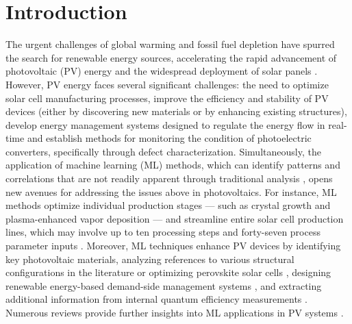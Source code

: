 \documentclass[a4paper,fleqn,draft]{cas-sc}
\begin{document}
\section{Introduction}%
\par
The urgent challenges of global warming and fossil fuel depletion have spurred the search
for renewable energy sources, accelerating the rapid advancement of photovoltaic (PV) energy and the widespread deployment of solar panels \cite{Pata2024, Holechek2022}.
However, PV energy faces several significant challenges:
the need to optimize solar cell manufacturing processes,
improve the efficiency and stability of PV devices
(either by discovering new materials or by enhancing existing structures),
develop energy management systems designed to regulate the energy flow in real-time and
establish methods for monitoring the condition of photoelectric converters, specifically through defect characterization.
Simultaneously, the application of machine learning (ML) methods,
which can identify patterns and correlations that are not readily apparent through traditional analysis \cite{Park2022},
opens new avenues for addressing the issues above in photovoltaics.
For instance, ML methods optimize individual production stages ---
such as crystal growth \cite{Qi2020} and plasma-enhanced vapor deposition \cite{Rachdi2021} ---
and streamline entire solar cell production lines, which may involve up to ten processing steps and forty-seven process parameter inputs \cite{Buratti2020}.
Moreover, ML techniques enhance PV devices by identifying key photovoltaic materials,
analyzing references to various structural configurations in the literature \cite{Zhang2022} or
optimizing perovskite solar cells \cite{Liu2023},
designing renewable energy-based demand-side management systems \cite{Asghar2023},
and extracting additional information from internal quantum efficiency measurements \cite{AbdullahVetter2025}.
Numerous reviews provide further insights into ML applications in PV systems \cite{DiSabatino2024, Datta2023, Jaiswal2023, Buratti2024, Bhatti2023}.
\end{document}
